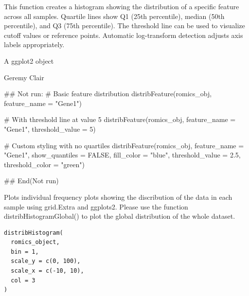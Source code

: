 \documentclass[a4paper]{book}
\begin{document}
%
\begin{Details}
This function creates a histogram showing the distribution of a specific feature across all samples.
Quartile lines show Q1 (25th percentile), median (50th percentile), and Q3 (75th percentile).
The threshold line can be used to visualize cutoff values or reference points.
Automatic log-transform detection adjusts axis labels appropriately.
\end{Details}
%
\begin{Value}
A ggplot2 object
\end{Value}
%
\begin{Author}
Geremy Clair
\end{Author}
%
\begin{Examples}
\begin{ExampleCode}
## Not run: 
# Basic feature distribution
distribFeature(romics_obj, feature_name = "Gene1")

# With threshold line at value 5
distribFeature(romics_obj, feature_name = "Gene1", threshold_value = 5)

# Custom styling with no quartiles
distribFeature(romics_obj, feature_name = "Gene1",
               show_quantiles = FALSE, fill_color = "blue",
               threshold_value = 2.5, threshold_color = "green")

## End(Not run)
\end{ExampleCode}
\end{Examples}
%
\begin{Description}
Plots individual frequency plots showing the discribution of the data in each sample using grid.Extra and ggplots2. Please use the function distribHistogramGlobal() to plot the global distribution of the whole dataset.
\end{Description}
%
\begin{Usage}
\begin{verbatim}
distribHistogram(
  romics_object,
  bin = 1,
  scale_y = c(0, 100),
  scale_x = c(-10, 10),
  col = 3
)
\end{verbatim}
\end{Usage}
%
\end{document}
